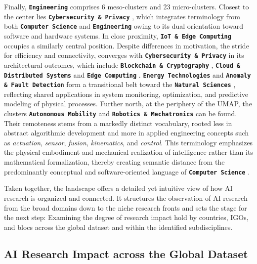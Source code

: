 \documentclass{article}
\begin{document}
	Finally, \textbf{\texttt{Engineering}}  comprises 6 meso-clusters and 23 micro-clusters. Closest to the center lies \textbf{\texttt{Cybersecurity \& Privacy}} , which integrates terminology from both \textbf{\texttt{Computer Science}}  and \textbf{\texttt{Engineering}}  owing to its dual orientation toward software and hardware systems. In close proximity, \textbf{\texttt{IoT \& Edge Computing}}  occupies a similarly central position. Despite differences in motivation, the stride for efficiency and connectivity, converges with \textbf{\texttt{Cybersecurity \& Privacy}}  in its architectural outcomes, which include \textbf{\texttt{Blockchain \& Cryptography}} , \textbf{\texttt{Cloud \& Distributed Systems}}  and \textbf{\texttt{Edge Computing}} . \textbf{\texttt{Energy Technologies}}  and \textbf{\texttt{Anomaly \& Fault Detection}}  form a transitional belt toward the \textbf{\texttt{Natural Sciences}} , reflecting shared applications in system monitoring, optimization, and predictive modeling of physical processes. Further north, at the periphery of the UMAP, the clusters \textbf{\texttt{Autonomous Mobility}}  and \textbf{\texttt{Robotics \& Mechatronics}}  can be found. Their remoteness stems from a markedly distinct vocabulary, rooted less in abstract algorithmic development and more in applied engineering concepts such as \textit{actuation}, \textit{sensor}, \textit{fusion}, \textit{kinematics}, and \textit{control}. This terminology emphasizes the physical embodiment and mechanical realization of intelligence rather than its mathematical formalization, thereby creating semantic distance from the predominantly conceptual and software-oriented language of \textbf{\texttt{Computer Science}} .
	
	Taken together, the landscape offers a detailed yet intuitive view of how AI research is organized and connected. It structures the observation of AI research from the broad domains down to the niche research fronts and sets the stage for the next step: Examining the degree of research impact hold by countries, IGOs, and blocs across the global dataset and within the identified subdisciplines.
	
	
	
	\subsection{AI Research Impact across the Global Dataset}
	\label{impact_across_global_dataset}
	
\end{document}
